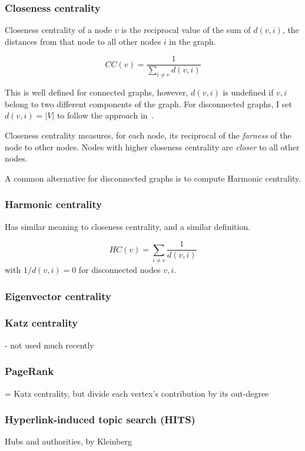 \subsubsection{Closeness centrality}

Closeness centrality of a node $v$ is the reciprocal value of the sum of $d(v, i)$, the distances from that node to all other nodes $i$ in the graph.

\[CC(v) = \frac{1}{\sum_{i \neq v} d(v, i)}\]

This is well defined for connected graphs, however, $d(v, i)$ is undefined if $v, i$ belong to two different components of the graph. For disconnected graphs, I set $d(v, i) = |V|$ to follow the approach in~\cite{Bozhilova2019}.

Closeness centrality measures, for each node, its reciprocal of the \textsl{farness} of the node to other nodes. Nodes with higher closeness centrality are \textsl{closer} to all other nodes.

A common alternative for disconnected graphs is to compute Harmonic centrality.

\subsubsection{Harmonic centrality}

Has similar meaning to closeness centrality, and a similar definition.

\[HC(v) = \sum_{i \neq v} \frac{1}{d(v, i)}\]
with $1 / d(v, i) = 0$ for disconnected nodes $v, i$.

\subsubsection{Eigenvector centrality}

\subsubsection{Katz centrality}
- not used much recently

\subsubsection{PageRank}
= Katz centrality, but divide each vertex's contribution by its out-degree

\subsubsection{Hyperlink-induced topic search (HITS)}
Hubs and authorities, by Kleinberg

